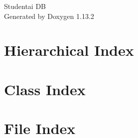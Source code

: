 \documentclass[twoside]{book}
\newcommand{\+}{\discretionary{\mbox{\scriptsize$\hookleftarrow$}}{}{}}
\newcommand{\clearemptydoublepage}{%
    \newpage{\pagestyle{empty}\cleardoublepage}%
  }
\begin{document}
  \raggedbottom
    \hypersetup{pageanchor=false,
                bookmarksnumbered=true,
                pdfencoding=unicode
               }
  \begin{titlepage}
  \vspace*{7cm}
  \begin{center}%
  {\Large Studentai DB}\\
  \vspace*{1cm}
  {\large Generated by Doxygen 1.13.2}\\
  \end{center}
  \end{titlepage}
  \clearemptydoublepage
  \tableofcontents
  \clearemptydoublepage
  \hypersetup{pageanchor=true}

\chapter{Hierarchical Index}

\chapter{Class Index}

\chapter{File Index}

\end{document}
